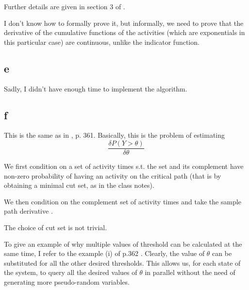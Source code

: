 \documentclass[12pt]{report}
\begin{document}
Further details are given in section 3 of \citep{fu_sensitivity_2006}.

I don't know how to formally prove it, but informally, we need to prove that the derivative of the cumulative functions of the activities (which are exponentials in this particular case) are continuous, unlike the indicator function.

\subsection*{e}

Sadly, I didn't have enough time to implement the algorithm.


\subsection*{f}



This is the same as in \citep{fu_sensitivity_2006}, p. 361. Basically, this is the problem of estimating 
$$\dfrac{\delta P(Y > \theta)}{\delta \theta}$$

We first condition on a set of activity times s.t. the set and its complement have non-zero probability of having an activity on the critical path (that is by obtaining a minimal cut set, as in the class notes).

We then condition on the complement set of activity times and take the sample path derivative \citep{fu_sensitivity_2006}.

The choice of cut set is not trivial.

To give an example of why multiple values of threshold can be calculated at the same time, I refer to the example (i) of p.362 \citep{fu_sensitivity_2006}. Clearly, the value of $\theta$ can be substituted for all the other desired thresholds. This allows us, for each state of the system, to query all the desired values of $\theta$ in parallel without the need of generating more pseudo-random variables.
\end{document}
